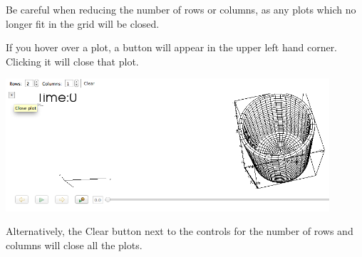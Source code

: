 Be careful when reducing the number of rows or columns, as any plots which no
longer fit in the grid will be closed.

If you hover over a plot, a button will appear in the upper left hand
corner. Clicking it will close that plot.

\begin{center}
\includegraphics[width=12cm]{images/ClosePlotButton}
\end{center}

Alternatively, the Clear button next to the controls for the number of rows and
columns will close all the plots.
